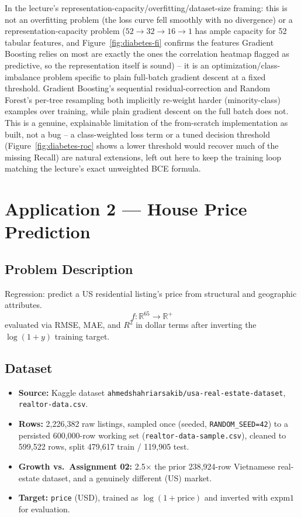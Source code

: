 \documentclass[11pt, a4paper]{article}
\begin{document}
In the lecture's representation-capacity/overfitting/dataset-size framing: this is not an
overfitting problem (the loss curve fell smoothly with no divergence) or a
representation-capacity problem ($52 \to 32 \to 16 \to 1$ has ample capacity for 52 tabular
features, and Figure~\ref{fig:diabetes-fi} confirms the features Gradient Boosting relies
on most are exactly the ones the correlation heatmap flagged as predictive, so the
representation itself is sound) -- it is an optimization/class-imbalance problem specific
to plain full-batch gradient descent at a fixed threshold. Gradient Boosting's sequential
residual-correction and Random Forest's per-tree resampling both implicitly re-weight
harder (minority-class) examples over training, while plain gradient descent on the full
batch does not. This is a genuine, explainable limitation of the from-scratch
implementation as built, not a bug -- a class-weighted loss term or a tuned decision
threshold (Figure~\ref{fig:diabetes-roc} shows a lower threshold would recover much of
the missing Recall) are natural extensions, left out here to keep the training loop
matching the lecture's exact unweighted BCE formula.

\section{Application 2 --- House Price Prediction}

\subsection{Problem Description}
Regression: predict a US residential listing's price from structural and geographic
attributes.
\[
f: \mathbb{R}^{65} \longrightarrow \mathbb{R}^{+}
\]
evaluated via RMSE, MAE, and $R^2$ in dollar terms after inverting the $\log(1+y)$
training target.

\subsection{Dataset}
\begin{itemize}
    \item \textbf{Source:} Kaggle dataset
    \texttt{ahmedshahriarsakib/usa-real-estate-dataset}, \texttt{realtor-data.csv}.
    \item \textbf{Rows:} 2,226,382 raw listings, sampled once (seeded,
    \texttt{RANDOM\_SEED=42}) to a persisted 600,000-row working set
    (\texttt{realtor-data-sample.csv}), cleaned to 599,522 rows, split 479,617 train /
    119,905 test.
    \item \textbf{Growth vs.\ Assignment 02:} 2.5$\times$ the prior 238,924-row Vietnamese
    real-estate dataset, and a genuinely different (US) market.
    \item \textbf{Target:} \texttt{price} (USD), trained as $\log(1+\text{price})$ and
    inverted with $\text{expm1}$ for evaluation.
\end{itemize}
\end{document}
